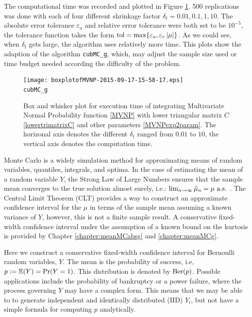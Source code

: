\documentclass{iitthesis}
\begin{document}
The computational time was recorded and plotted in Figure \ref{fig:MVNPadaptivitiy}. 500 replications was done with each of four different shrinkage factor $\delta_t =  0.01,0.1, 1, 10$. The absolute error tolerance $\varepsilon_a$  and relative error tolerance were both set to be $10^{-5}$, the tolerance function takes the form $\operatorname{tol} = \max \{\varepsilon_a,\varepsilon_r \left \lvert \mu \right \rvert\}$. As we could see, when $\delta_t$ gets large, the algorithm uses relatively more time. This plots show the adaption of the algorithm {\tt cubMC\_g}, which, may adjust the sample size used or time budget needed according the difficulty of the problem.

\begin{figure}
\centering
 \texttt{[image: boxplotofMVNP-2015-09-17-15-58-17.eps]} \\ {\tt cubMC\_g} 
\caption{Box and whisker plot for execution time of integrating Multivariate Normal Probability function \eqref{MVNP} with
lower triangular matrix $C$ \eqref{lowertrimatrixC} and other parameters \eqref{MVNPexp2param}. The horizonal axis denotes the different $\delta_t$ ranged from $0.01$ to $10$, the vertical axis denotes the computation time. \label{fig:MVNPadaptivitiy} }
\end{figure}

\label{chapter:meanMCberg}
Monte Carlo is a widely simulation method for approximating means of random variables, quantiles, integrals, and optima. In the case of estimating the mean of a random variable $Y$, the Strong Law of Large Numbers ensures that the sample mean converges to the true solution almost surely, i.e.: $\lim_{n \to \infty} \hat{\mu}_n =\mu \text{ a.s.}$ \cite[Theorem 20.1]{JP04}.  The Central Limit Theorem (CLT) provides a way to construct an approximate confidence interval for the $\mu$ in terms of the sample mean assuming a known variance of $Y$, however, this is not a finite sample result.  A conservative fixed-width confidence interval under the assumption of a known bound on the kurtosis is provided by Chapter \ref{chapter:meanMCabsg} and \ref{chapter:meanMCg}.

Here we construct a conservative fixed-width confidence interval for Bernoulli random variables, $Y$. The mean is the probability of success, i.e,  $p:= \mathbb{E}(Y)=\Pr(Y=1)$. This distribution is denoted by $\operatorname{Ber}(p)$.  Possible applications include the probability of bankruptcy or a power failure, where the process governing $Y$ may have a complex form.  This means that we may be able to to generate independent and identically distributed (IID) $Y_i$, but not have a simple formula for computing $p$ analytically. 
\end{document}
